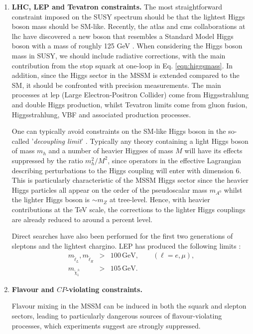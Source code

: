 \begin{enumerate}
\item \textbf{LHC, LEP and Tevatron constraints.} The most straightforward constraint imposed on the SUSY spectrum should be that the lightest Higgs boson mass should be SM-like. Recently, the \acrshort{atlas} and \acrshort{cms} collaborations at \acrshort{lhc} have discovered a new boson that resembles a Standard Model Higgs boson with a mass of roughly 125 GeV \cite{RN62,RN63}. When considering the Higgs boson mass in SUSY, we should include radiative corrections, with the main contribution from the stop squark at one-loop in Eq. \ref{eqn:higgsmass}. In addition, since the Higgs sector in the MSSM is extended compared to the SM, it should be confronted with precision measurements. The main processes at \acrshort{lep} (Large Electron-Positron Collider) come from Higgsstrahlung and double Higgs production, whilst Tevatron limits come from gluon fusion, Higgsstrahlung, VBF and associated production processes.

One can typically avoid constraints on the SM-like Higgs boson in the so-called '\textit{decoupling limit}' \cite{RN572}. Typically any theory containing a light Higgs boson of mass $m_h$ and a number of heavier Higgses of mass $M$ will have its effects suppressed by the ratio $m^2_{h}/M^2$, since operators in the effective Lagrangian describing perturbations to the Higgs coupling will enter with dimension 6. This is particularly characteristic of the MSSM Higgs sector since the heavier Higgs particles all appear on the order of the pseudoscalar mass $m_{A^0}$ whilst the lighter Higgs boson is $\sim m_Z$ at tree-level. Hence, with heavier contributions at the TeV scale, the corrections to the lighter Higgs couplings are already reduced to around a percent level.

Direct searches have also been performed for the first two generations of sleptons and the lightest chargino. LEP has produced the following limits \cite{RN493}:
\begin{eqnarray}
m_{\tilde{\ell}_L},m_{\tilde{\ell}_R} &>& 100\,\text{GeV}, \qquad (\ell=e,\mu), \\
m_{\tilde{\chi}^{\pm}_1} &>& 105\,\text{GeV}.
\end{eqnarray}

\item \textbf{Flavour and $CP$-violating constraints.}

Flavour mixing in the MSSM can be induced in both the squark and slepton sectors, leading to particularly dangerous sources of flavour-violating processes, which experiments suggest are strongly suppressed.


\end{enumerate}
